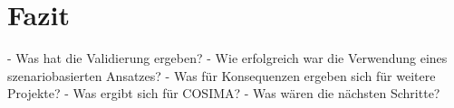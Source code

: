 \chapter{Fazit} %
\label{cha:fazit}

- Was hat die Validierung ergeben?
- Wie erfolgreich war die Verwendung eines szenariobasierten Ansatzes?
- Was für Konsequenzen ergeben sich für weitere Projekte?
- Was ergibt sich für COSIMA?
- Was wären die nächsten Schritte?

